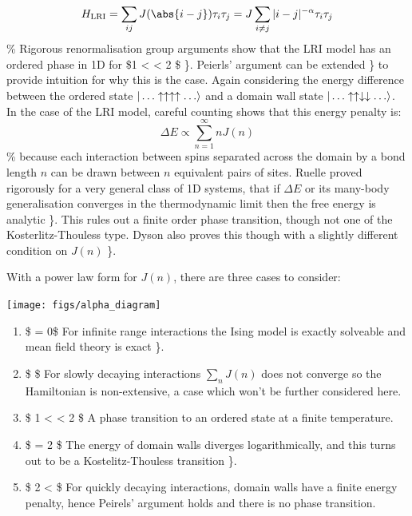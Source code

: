 \[H_{\mathrm{LRI}} = \sum_{ij} J(\abs{i-j}) \tau_i \tau_j = J \sum_{i\neq j} |i - j|^{-\alpha} \tau_i \tau_j\] \% Rigorous renormalisation group arguments show that the LRI model has an ordered phase in 1D for \$1 \textless{} \alpha \textless{} 2 \$ \textcite{dyson_existence_1969}\}. Peierls' argument can be extended \textcite{thouless_long-range_1969}\} to provide intuition for why this is the case. Again considering the energy difference between the ordered state \(|\ldots\uparrow\uparrow\uparrow\uparrow\ldots\rangle\) and a domain wall state \(|\ldots\uparrow\uparrow\downarrow\downarrow\ldots\rangle\). In the case of the LRI model, careful counting shows that this energy penalty is: \[\Delta E \propto \sum_{n=1}^{\infty} n J(n)\] \% because each interaction between spins separated across the domain by a bond length \(n\) can be drawn between \(n\) equivalent pairs of sites. Ruelle proved rigorously for a very general class of 1D systems, that if \(\Delta E\) or its many-body generalisation converges in the thermodynamic limit then the free energy is analytic \textcite{ruelle_statistical_1968}\}. This rules out a finite order phase transition, though not one of the Kosterlitz-Thouless type. Dyson also proves this though with a slightly different condition on \(J(n)\) \textcite{dyson_existence_1969}\}.

With a power law form for \(J(n)\), there are three cases to consider:

\begin{center}
    \texttt{[image: figs/alpha\_diagram]}
\end{center}

\begin{enumerate}
\def\labelenumi{\arabic{enumi}.}
\tightlist
\item
  \$ \alpha = 0\$ For infinite range interactions the Ising model is exactly solveable and mean field theory is exact \textcite{lipkin_validity_1965}\}.
\item
  \$ \alpha {}\$ For slowly decaying interactions \(\sum_n J(n)\) does not converge so the Hamiltonian is non-extensive, a case which won't be further considered here.
\item
  \$ 1 \textless{} \alpha \textless{} 2 \$ A phase transition to an ordered state at a finite temperature.
\item
  \$ \alpha = 2 \$ The energy of domain walls diverges logarithmically, and this turns out to be a Kostelitz-Thouless transition \textcite{thouless_long-range_1969}\}.
\item
  \$ 2 \textless{} \alpha \$ For quickly decaying interactions, domain walls have a finite energy penalty, hence Peirels' argument holds and there is no phase transition.
\end{enumerate}

